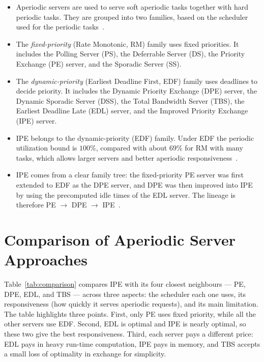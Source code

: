 \documentclass[conference]{IEEEtran}
\begin{document}
\begin{itemize}
  \item Aperiodic servers are used to serve soft aperiodic tasks together with
        hard periodic tasks. They are grouped into two families, based on the
        scheduler used for the periodic tasks~\cite{buttazzo}.
  \item The \emph{fixed-priority} (Rate Monotonic, RM) family uses fixed
        priorities. It includes the Polling Server (PS), the Deferrable Server
        (DS), the Priority Exchange (PE) server, and the Sporadic Server (SS).
  \item The \emph{dynamic-priority} (Earliest Deadline First, EDF) family uses
        deadlines to decide priority. It includes the Dynamic Priority
        Exchange (DPE) server, the Dynamic Sporadic Server (DSS), the Total
        Bandwidth Server (TBS), the Earliest Deadline Late (EDL) server, and
        the Improved Priority Exchange (IPE) server.
  \item IPE belongs to the dynamic-priority (EDF) family. Under EDF the
        periodic utilization bound is $100\%$, compared with about $69\%$ for
        RM with many tasks, which allows larger servers and better aperiodic
        responsiveness~\cite{buttazzo}.
  \item IPE comes from a clear family tree: the fixed-priority PE server was
        first extended to EDF as the DPE server, and DPE was then improved into
        IPE by using the precomputed idle times of the EDL server. The lineage
        is therefore PE $\rightarrow$ DPE $\rightarrow$ IPE~\cite{spuri1996}.
\end{itemize}

\section{Comparison of Aperiodic Server Approaches}

Table~\ref{tab:comparison} compares IPE with its four closest neighbours ---
PE, DPE, EDL, and TBS --- across three aspects: the scheduler each one uses,
its responsiveness (how quickly it serves aperiodic requests), and its main
limitation. The table highlights three points. First, only PE uses fixed
priority, while all the other servers use EDF. Second, EDL is optimal and IPE
is nearly optimal, so these two give the best responsiveness. Third, each
server pays a different price: EDL pays in heavy run-time computation, IPE pays
in memory, and TBS accepts a small loss of optimality in exchange for
simplicity.
\end{document}
